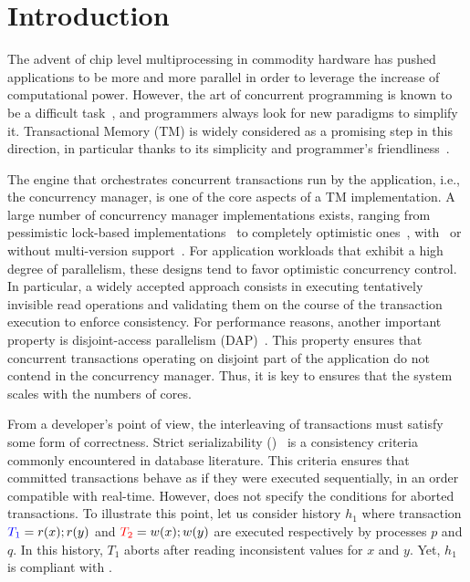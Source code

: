 \section{Introduction}

The advent of chip level multiprocessing in commodity hardware has pushed applications to be more and more parallel in order to leverage the increase of computational power.
However, the art of concurrent programming is known to be a difficult task~\cite{Lee:2006:PT:1137232.1137289}, and programmers always look for new paradigms to simplify it.
Transactional Memory (TM) is widely considered as a promising step in this direction, in particular thanks to its simplicity and programmer's friendliness~\cite{Dragojevic:2011:WSM:1924421.1924440}.

The engine that orchestrates concurrent transactions run by the application, i.e., the concurrency manager, is one of the core aspects of a TM implementation.
A large number of concurrency manager implementations exists, ranging from pessimistic lock-based implementations~\cite{harris2005revocable,afek2012pessimistic} to completely optimistic ones~\cite{hassan2014optimistic}, with~\cite{perelman2011smv} or without multi-version support~\cite{attiya2012single}.
For application workloads that exhibit a high degree of parallelism, these designs tend to favor optimistic concurrency control.
In particular, a widely accepted approach consists in executing tentatively invisible read operations and validating them on the course of the transaction execution to enforce consistency.
For performance reasons, another important property is disjoint-access parallelism (DAP)~\cite{ellen2012universal}.
This property ensures that concurrent transactions operating on disjoint part of the application do not contend in the concurrency manager.
Thus, it is key to ensures that the system scales with the numbers of cores.

From a developer's point of view, the interleaving of transactions must satisfy some form of correctness.
Strict serializability (\SSER)~\cite{herlihy1990linearizability} is a consistency criteria commonly encountered in database literature.
This criteria ensures that committed transactions behave as if they were executed sequentially, in an order compatible with real-time.
However, \SSER does not specify the conditions for aborted transactions.
To illustrate this point, let us consider history $h_1$ where transaction ${\color{blue}{T_1}}=r(x);r(y)$ and ${\color{red}{T_2}}=w(x);w(y)$ are executed respectively by processes $p$ and $q$.
In this history, $T_1$ aborts after reading inconsistent values for $x$ and $y$.
Yet, $h_1$ is compliant with \SSER.


